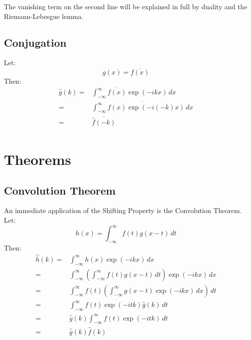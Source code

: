\documentclass[12pt]{report}
\begin{document}
The vanishing term on the second line will be explained in full by duality and the Riemann-Lebesgue lemma.

\subsection{Conjugation}
Let:
\[g(x) = \overline{f(x)}\]
Then:
\begin{equation*}
\begin{aligned}
	\hat{g}(k) =& \int_{-\infty}^{\infty}\overline{f(x)}\exp(-ikx)\,dx\\
	=& \overline{\int_{-\infty}^{\infty}f(x)\exp(-i(-k)x)\,dx}\\
	=& \overline{\hat{f}(-k)} \\
\end{aligned}
\end{equation*}

\section{Theorems}
\subsection{Convolution Theorem}
An immediate application of the Shifting Property is the Convolution Theorem.
Let:
\[h(x) = \int_{-\infty}^{\infty}f(t)g(x-t)\,dt\]
Then:
\begin{equation*}
\begin{aligned}
\hat{h}(k) =& \int_{-\infty}^{\infty}h(x)\exp(-ikx)\,dx\\
=& \int_{-\infty}^{\infty}\left(\int_{-\infty}^{\infty}f(t)g(x-t)\,dt\right)\exp(-ikx)\,dx\\
=& \int_{-\infty}^{\infty}f(t)\left(\int_{-\infty}^{\infty}g(x-t)\exp(-ikx)\,dx\right)\,dt\\
=& \int_{-\infty}^{\infty}f(t)\exp(-itk)\hat{g}(k)\,dt\\
=& \hat{g}(k)\int_{-\infty}^{\infty}f(t)\exp(-itk)\,dt\\
=& \hat{g}(k)\hat{f}(k)\\
\end{aligned}
\end{equation*}
\end{document}
